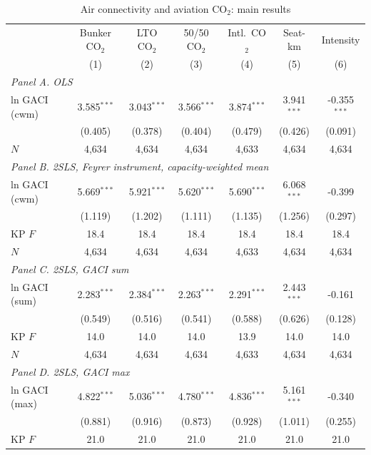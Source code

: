 \documentclass[12pt]{article}
\begin{document}
\begin{table}[htbp]
\centering
\begin{threeparttable}
\caption{Air connectivity and aviation CO$_2$: main results}
\label{tab:main}
\footnotesize
\begin{tabular}{lcccccc}
\toprule
 & \multicolumn{1}{c}{Bunker CO$_2$} & \multicolumn{1}{c}{LTO CO$_2$} & \multicolumn{1}{c}{50/50 CO$_2$} & \multicolumn{1}{c}{Intl.\ CO$_2$} & \multicolumn{1}{c}{Seat-km} & \multicolumn{1}{c}{Intensity} \\
 & (1) & (2) & (3) & (4) & (5) & (6) \\
\midrule
\multicolumn{7}{l}{\textit{Panel A. OLS}} \\
  ln GACI (cwm) & 3.585$^{***}$ & 3.043$^{***}$ & 3.566$^{***}$ & 3.874$^{***}$ & 3.941$^{***}$ & -0.355$^{***}$ \\
   & (0.405) & (0.378) & (0.404) & (0.479) & (0.426) & (0.091) \\
  $N$ & 4,634 & 4,634 & 4,634 & 4,633 & 4,634 & 4,634 \\
\midrule
\multicolumn{7}{l}{\textit{Panel B. 2SLS, Feyrer instrument, capacity-weighted mean}} \\
  ln GACI (cwm) & 5.669$^{***}$ & 5.921$^{***}$ & 5.620$^{***}$ & 5.690$^{***}$ & 6.068$^{***}$ & -0.399 \\
   & (1.119) & (1.202) & (1.111) & (1.135) & (1.256) & (0.297) \\
  KP $F$ & 18.4 & 18.4 & 18.4 & 18.4 & 18.4 & 18.4 \\
  $N$ & 4,634 & 4,634 & 4,634 & 4,633 & 4,634 & 4,634 \\
\midrule
\multicolumn{7}{l}{\textit{Panel C. 2SLS, GACI sum}} \\
  ln GACI (sum) & 2.283$^{***}$ & 2.384$^{***}$ & 2.263$^{***}$ & 2.291$^{***}$ & 2.443$^{***}$ & -0.161 \\
   & (0.549) & (0.516) & (0.541) & (0.588) & (0.626) & (0.128) \\
  KP $F$ & 14.0 & 14.0 & 14.0 & 13.9 & 14.0 & 14.0 \\
  $N$ & 4,634 & 4,634 & 4,634 & 4,633 & 4,634 & 4,634 \\
\midrule
\multicolumn{7}{l}{\textit{Panel D. 2SLS, GACI max}} \\
  ln GACI (max) & 4.822$^{***}$ & 5.036$^{***}$ & 4.780$^{***}$ & 4.836$^{***}$ & 5.161$^{***}$ & -0.340 \\
   & (0.881) & (0.916) & (0.873) & (0.928) & (1.011) & (0.255) \\
  KP $F$ & 21.0 & 21.0 & 21.0 & 21.0 & 21.0 & 21.0 \\

\end{tabular}
\end{threeparttable}
\end{table}
\end{document}
